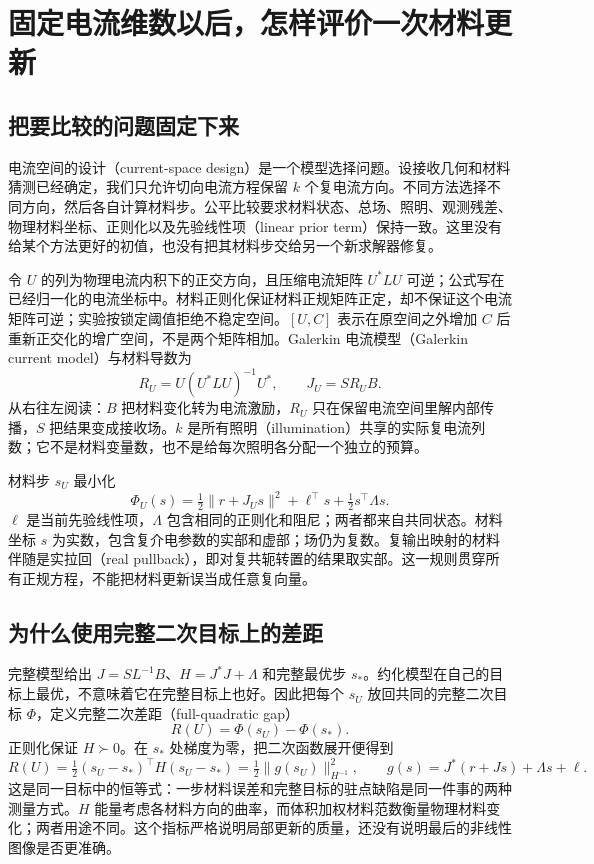 \section{固定电流维数以后，怎样评价一次材料更新}
\subsection{把要比较的问题固定下来}
电流空间的设计（current-space design）是一个模型选择问题。设接收几何和材料猜测已经确定，我们只允许切向电流方程保留 $k$ 个复电流方向。不同方法选择不同方向，然后各自计算材料步。公平比较要求材料状态、总场、照明、观测残差、物理材料坐标、正则化以及先验线性项（linear prior term）保持一致。这里没有给某个方法更好的初值，也没有把其材料步交给另一个新求解器修复。

令 $U$ 的列为物理电流内积下的正交方向，且压缩电流矩阵 $U^*LU$ 可逆；公式写在已经归一化的电流坐标中。材料正则化保证材料正规矩阵正定，却不保证这个电流矩阵可逆；实验按锁定阈值拒绝不稳定空间。$[U,C]$ 表示在原空间之外增加 $C$ 后重新正交化的增广空间，不是两个矩阵相加。Galerkin 电流模型（Galerkin current model）与材料导数为
\[
 R_U=U(U^*LU)^{-1}U^*,\qquad J_U=SR_UB.
\]
从右往左阅读：$B$ 把材料变化转为电流激励，$R_U$ 只在保留电流空间里解内部传播，$S$ 把结果变成接收场。$k$ 是所有照明（illumination）共享的实际复电流列数；它不是材料变量数，也不是给每次照明各分配一个独立的预算。

材料步 $s_U$ 最小化
\[
 \Phi_U(s)=\tfrac12\|r+J_Us\|^2+\ell^\top s+
 \tfrac12s^\top\Lambda s.
\]
$\ell$ 是当前先验线性项，$\Lambda$ 包含相同的正则化和阻尼；两者都来自共同状态。材料坐标 $s$ 为实数，包含复介电参数的实部和虚部；场仍为复数。复输出映射的材料伴随是实拉回（real pullback），即对复共轭转置的结果取实部。这一规则贯穿所有正规方程，不能把材料更新误当成任意复向量。

\subsection{为什么使用完整二次目标上的差距}
完整模型给出 $J=SL^{-1}B$、$H=J^*J+\Lambda$ 和完整最优步 $s_*$。约化模型在自己的目标上最优，不意味着它在完整目标上也好。因此把每个 $s_U$ 放回共同的完整二次目标 $\Phi$，定义完整二次差距（full-quadratic gap）
\[
 R(U)=\Phi(s_U)-\Phi(s_*) .
\]
正则化保证 $H\succ0$。在 $s_*$ 处梯度为零，把二次函数展开便得到
\[
 R(U)=\tfrac12(s_U-s_*)^\top H(s_U-s_*)
 =\tfrac12\|g(s_U)\|_{H^{-1}}^2,
\qquad g(s)=J^*(r+Js)+\Lambda s+\ell.
\]
这是同一目标中的恒等式：一步材料误差和完整目标的驻点缺陷是同一件事的两种测量方式。$H$ 能量考虑各材料方向的曲率，而体积加权材料范数衡量物理材料变化；两者用途不同。这个指标严格说明局部更新的质量，还没有说明最后的非线性图像是否更准确。

